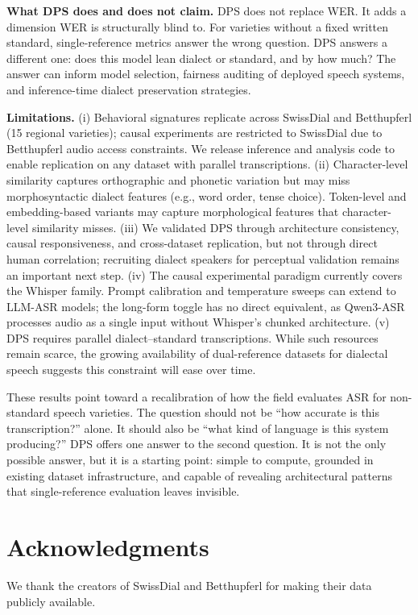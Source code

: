 \documentclass[11pt,a4paper]{article}
\begin{document}
\textbf{What DPS does and does not claim.} DPS does not replace WER. It adds a dimension WER is structurally blind to. For varieties without a fixed written standard, single-reference metrics answer the wrong question. DPS answers a different one: does this model lean dialect or standard, and by how much? The answer can inform model selection, fairness auditing of deployed speech systems, and inference-time dialect preservation strategies.

\textbf{Limitations.} (i) Behavioral signatures replicate across SwissDial and Betthupferl (15 regional varieties); causal experiments are restricted to SwissDial due to Betthupferl audio access constraints. We release inference and analysis code to enable replication on any dataset with parallel transcriptions. (ii) Character-level similarity captures orthographic and phonetic variation but may miss morphosyntactic dialect features (e.g., word order, tense choice). Token-level and embedding-based variants may capture morphological features that character-level similarity misses. (iii) We validated DPS through architecture consistency, causal responsiveness, and cross-dataset replication, but not through direct human correlation; recruiting dialect speakers for perceptual validation remains an important next step. (iv) The causal experimental paradigm currently covers the Whisper family. Prompt calibration and temperature sweeps can extend to LLM-ASR models; the long-form toggle has no direct equivalent, as Qwen3-ASR processes audio as a single input without Whisper's chunked architecture. (v) DPS requires parallel dialect--standard transcriptions. While such resources remain scarce, the growing availability of dual-reference datasets for dialectal speech suggests this constraint will ease over time.

These results point toward a recalibration of how the field evaluates ASR for non-standard speech varieties. The question should not be ``how accurate is this transcription?'' alone. It should also be ``what kind of language is this system producing?'' DPS offers one answer to the second question. It is not the only possible answer, but it is a starting point: simple to compute, grounded in existing dataset infrastructure, and capable of revealing architectural patterns that single-reference evaluation leaves invisible.

\section*{Acknowledgments}
We thank the creators of SwissDial and Betthupferl for making their data publicly available.



\end{document}
